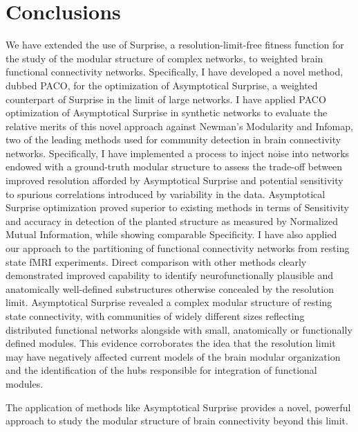 \section{Conclusions}
We have extended the use of Surprise, a resolution-limit-free fitness function for the study of the modular structure of complex networks, to weighted brain functional connectivity networks.
Specifically, I have developed a novel method, dubbed PACO, for the optimization of Asymptotical Surprise, a weighted counterpart of Surprise in the limit of large networks.
I have applied PACO optimization of Asymptotical Surprise in synthetic networks to evaluate the relative merits of this novel approach against Newman's Modularity and Infomap, two of the leading methods used for community detection in brain connectivity networks.
Specifically, I have implemented a process to inject noise into networks endowed with a ground-truth modular structure to assess the trade-off between improved resolution afforded by Asymptotical Surprise and potential sensitivity to spurious correlations introduced by variability in the data.
Asymptotical Surprise optimization proved superior to existing methods in terms of Sensitivity and accuracy in detection of the planted structure as measured by Normalized Mutual Information, while showing comparable Specificity.
I have also applied our approach to the partitioning of functional connectivity networks from resting state fMRI experiments.
Direct comparison with other methods clearly demonstrated improved capability to identify neurofunctionally plausible and anatomically well-defined substructures otherwise concealed by the resolution limit.
Asymptotical Surprise revealed a complex modular structure of resting state connectivity, with communities of widely different sizes reflecting distributed functional networks alongside with small, anatomically or functionally defined modules.
This evidence corroborates the idea that the resolution limit may have negatively affected current models of the brain modular organization and the identification of the hubs responsible for integration of functional modules.

The application of methods like Asymptotical Surprise provides a novel, powerful approach to study the modular structure of brain connectivity beyond this limit.

